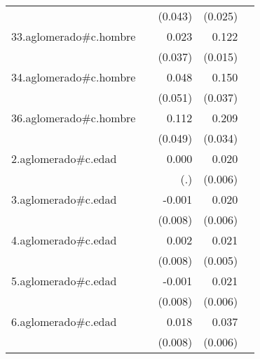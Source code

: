 {\begin{longtable}{l*{4}{D{.}{.}{-1}}}
            &                     &     (0.043)         &     (0.025)         &                     \\
\addlinespace
33.aglomerado#c.hombre&                     &       0.023         &       0.122\sym{***}&                     \\
            &                     &     (0.037)         &     (0.015)         &                     \\
\addlinespace
34.aglomerado#c.hombre&                     &       0.048         &       0.150\sym{***}&                     \\
            &                     &     (0.051)         &     (0.037)         &                     \\
\addlinespace
36.aglomerado#c.hombre&                     &       0.112\sym{*}  &       0.209\sym{***}&                     \\
            &                     &     (0.049)         &     (0.034)         &                     \\
\addlinespace
2.aglomerado#c.edad&                     &       0.000         &       0.020\sym{***}&                     \\
            &                     &         (.)         &     (0.006)         &                     \\
\addlinespace
3.aglomerado#c.edad&                     &      -0.001         &       0.020\sym{***}&                     \\
            &                     &     (0.008)         &     (0.006)         &                     \\
\addlinespace
4.aglomerado#c.edad&                     &       0.002         &       0.021\sym{***}&                     \\
            &                     &     (0.008)         &     (0.005)         &                     \\
\addlinespace
5.aglomerado#c.edad&                     &      -0.001         &       0.021\sym{***}&                     \\
            &                     &     (0.008)         &     (0.006)         &                     \\
\addlinespace
6.aglomerado#c.edad&                     &       0.018\sym{*}  &       0.037\sym{***}&                     \\
            &                     &     (0.008)         &     (0.006)         &                     \\

\end{longtable}}
